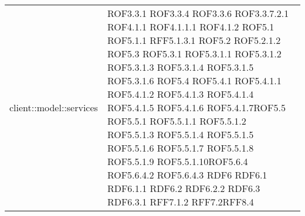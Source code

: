 \begin{center}
\begin{longtable}{| p{9cm} | p{4cm} |}
client::model::services  & ROF3.3.1 \newline ROF3.3.4 \newline ROF3.3.6 \newline ROF3.3.7.2.1 \newline ROF4.1.1 \newline ROF4.1.1.1 \newline ROF4.1.2 \newline ROF5.1 \newline ROF5.1.1 \newline RFF5.1.3.1 \newline ROF5.2 \newline ROF5.2.1.2 \newline ROF5.3 \newline ROF5.3.1 \newline ROF5.3.1.1 \newline ROF5.3.1.2 \newline ROF5.3.1.3 \newline ROF5.3.1.4 \newline ROF5.3.1.5 \newline ROF5.3.1.6 \newline ROF5.4 \newline ROF5.4.1 \newline ROF5.4.1.1 \newline ROF5.4.1.2 \newline ROF5.4.1.3 \newline ROF5.4.1.4 \newline ROF5.4.1.5 \newline ROF5.4.1.6  \newline ROF5.4.1.7\newline ROF5.5 \newline ROF5.5.1 \newline ROF5.5.1.1 \newline ROF5.5.1.2 \newline ROF5.5.1.3 \newline ROF5.5.1.4 \newline ROF5.5.1.5 \newline ROF5.5.1.6  \newline ROF5.5.1.7 \newline ROF5.5.1.8 \newline ROF5.5.1.9 \newline ROF5.5.1.10\newline ROF5.6.4 \newline ROF5.6.4.2 \newline ROF5.6.4.3 \newline RDF6 \newline RDF6.1 \newline RDF6.1.1 \newline RDF6.2 \newline RDF6.2.2 \newline RDF6.3 \newline RDF6.3.1 \newline RFF7.1.2 \newline RFF7.2\newline RFF8.4 \newline \\

\end{longtable}
\end{center}
